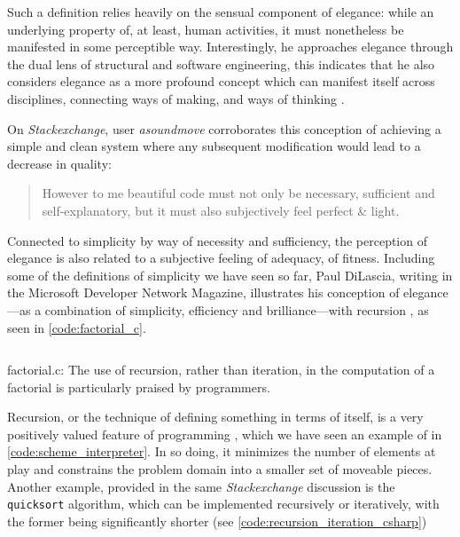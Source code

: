 Such a definition relies heavily on the sensual component of elegance: while an underlying property of, at least, human activities, it must nonetheless be manifested in some perceptible way. Interestingly, he approaches elegance through the dual lens of structural and software engineering, this indicates that he also considers elegance as a more profound concept which can manifest itself across disciplines, connecting ways of making, and ways of thinking \citep{mclennan_who_1997}. 

On \emph{Stackexchange}, user \emph{asoundmove} corroborates this conception of achieving a simple and clean system where any subsequent modification would lead to a decrease in quality:

\begin{quote}
  However to me beautiful code must not only be necessary, sufficient and self-explanatory, but it must also subjectively feel perfect \& light. \citep{stackoverflow_how_2013}
\end{quote}

Connected to simplicity by way of necessity and sufficiency, the perception of elegance is also related to a subjective feeling of adequacy, of fitness. Including some of the definitions of simplicity we have seen so far, Paul DiLascia, writing in the Microsoft Developer Network Magazine, illustrates his conception of elegance—as a combination of simplicity, efficiency and brilliance—with recursion \citep{dilascia_end_2019}, as seen in \autoref{code:factorial_c}.

\begin{listing}
  \inputminted{c}{./corpus/factorial.c}
  \caption{factorial.c: The use of recursion, rather than iteration, in the computation of a factorial is particularly praised by programmers.}
  \label{code:factorial_c}
\end{listing}

Recursion, or the technique of defining something in terms of itself, is a very positively valued feature of programming \citep{abelson_structure_1979}, which we have seen an example of in \autoref{code:scheme_interpreter}. In so doing, it minimizes the number of elements at play and constrains the problem domain into a smaller set of moveable pieces. Another example, provided in the same \emph{Stackexchange} discussion is the \lstinline{quicksort} algorithm, which can be implemented recursively or iteratively, with the former being significantly shorter (see \autoref{code:recursion_iteration_csharp})

